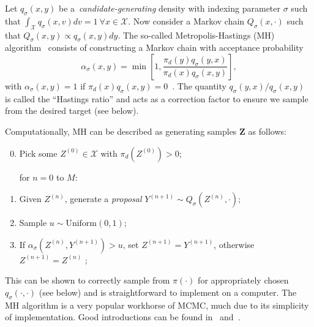 Let $q_\sigma(x, y)$ be a~\textit{candidate-generating} density with indexing parameter %
$\sigma$ such that $\int_{\mathcal{X}} q_\sigma(x, v) dv = 1 \: \forall x \in \mathcal{X}$. 
Now consider a Markov chain $Q_\sigma(x, \cdot)$ such that $Q_\sigma(x, y) \propto q_\sigma(x, y) dy$.
The so-called Metropolis-Hastings (MH) algorithm~\citep{Metropolis1953,Hastings1970} consists of constructing a Markov chain with acceptance probability
\begin{equation}
 \label{eq:acceptance}
 \alpha_\sigma(x, y) = \min \left[1, \frac{\pi_d(y) q_\sigma(y, x)}{\pi_d(x) q_\sigma(x, y)} \right],
\end{equation}
with $\alpha_\sigma(x, y) = 1$ if $\pi_d(x) q_\sigma(x, y) = 0$~\citep[p. 329]{Chib1995}.
The quantity $q_\sigma(y, x)/ q_\sigma(x, y)$ is called the ``Hastings ratio'' and acts as a correction factor to ensure we sample from the desired target (see below).

Computationally, MH can be described as generating samples $\boldsymbol Z$ as follows:
\begin{enumerate}
 \setcounter{enumi}{-1}
 \item Pick some $Z^{(0)} \in \mathcal{X}$ with $\pi_d(Z^{(0)}) > 0$;
 
 for $n = 0$ to $M$:
 \item Given $Z^{(n)}$, generate a \textit{proposal} $Y^{(n + 1)} \sim Q_\sigma(Z^{(n)}, \cdot)$;
 \item Sample $u \sim \text{Uniform}(0, 1)$;
 \item If $\alpha_\sigma(Z^{(n)},  Y^{(n + 1)}) > u$, set $Z^{(n + 1)} = Y^{(n + 1)}$, otherwise $Z^{(n + 1)} = Z^{(n)}$ ;
\end{enumerate}
This can be shown to correctly sample from $\pi(\cdot)$ for appropriately chosen $q_\sigma(\cdot, \cdot)$ (see below) and is straightforward to implement on a computer.
The MH algorithm is a very popular workhorse of MCMC, much due to its simplicity of implementation.
Good introductions can be found in~\cite{Chib1995} and~\cite{Robert2015}.

